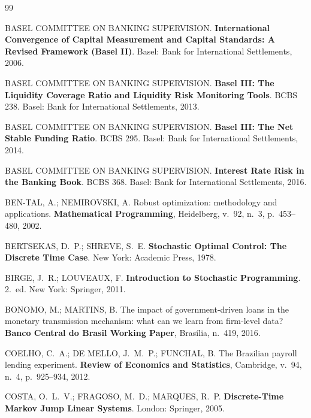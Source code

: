 \documentclass[12pt, a4paper, oneside]{article}
\begin{document}
\begin{thebibliography}{99}

  BASEL COMMITTEE ON BANKING SUPERVISION.
  \textbf{International Convergence of Capital Measurement and Capital
  Standards: A Revised Framework (Basel II)}.
  Basel: Bank for International Settlements, 2006.

  BASEL COMMITTEE ON BANKING SUPERVISION.
  \textbf{Basel III: The Liquidity Coverage Ratio and Liquidity Risk
  Monitoring Tools}. BCBS 238.
  Basel: Bank for International Settlements, 2013.

  BASEL COMMITTEE ON BANKING SUPERVISION.
  \textbf{Basel III: The Net Stable Funding Ratio}. BCBS 295.
  Basel: Bank for International Settlements, 2014.

  BASEL COMMITTEE ON BANKING SUPERVISION.
  \textbf{Interest Rate Risk in the Banking Book}. BCBS 368.
  Basel: Bank for International Settlements, 2016.

  BEN-TAL, A.; NEMIROVSKI, A.
  Robust optimization: methodology and applications.
  \textbf{Mathematical Programming}, Heidelberg, v.~92, n.~3,
  p.~453--480, 2002.

  BERTSEKAS, D.~P.; SHREVE, S.~E.
  \textbf{Stochastic Optimal Control: The Discrete Time Case}.
  New York: Academic Press, 1978.

  BIRGE, J.~R.; LOUVEAUX, F.
  \textbf{Introduction to Stochastic Programming}.
  2.~ed. New York: Springer, 2011.

  BONOMO, M.; MARTINS, B.
  The impact of government-driven loans in the monetary transmission
  mechanism: what can we learn from firm-level data?
  \textbf{Banco Central do Brasil Working Paper}, Brasília, n.~419, 2016.

  COELHO, C.~A.; DE MELLO, J.~M.~P.; FUNCHAL, B.
  The Brazilian payroll lending experiment.
  \textbf{Review of Economics and Statistics}, Cambridge, v.~94, n.~4,
  p.~925--934, 2012.

  COSTA, O.~L.~V.; FRAGOSO, M.~D.; MARQUES, R.~P.
  \textbf{Discrete-Time Markov Jump Linear Systems}.
  London: Springer, 2005.


\end{thebibliography}
\end{document}
